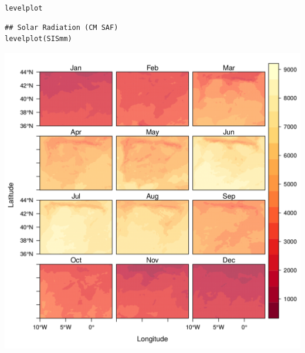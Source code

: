 \documentclass[xcolor={usenames,svgnames,dvipsnames}]{beamer}
\begin{document}
\begin{frame}[fragile,label=sec-7]{\texttt{levelplot}}
 \lstset{language=R,numbers=none}
\begin{lstlisting}
## Solar Radiation (CM SAF)
levelplot(SISmm)
\end{lstlisting}

\begin{center}
\includegraphics[height=0.65\textheight]{figs/levelplot.png}
\end{center}
\end{frame}
\end{document}
